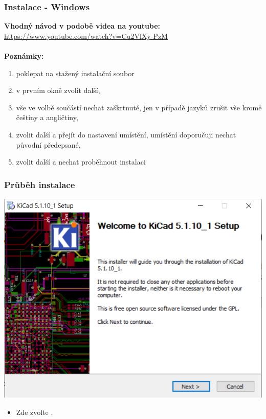 \documentclass{beamer}
\begin{document}
	\begin{frame}
    \frametitle{Instalace - Windows}
    	\textbf{Vhodný návod v podobě videa na youtube:} \url{https://www.youtube.com/watch?v=Cu2VlXy-PzM} \\~\\
    	
    	\textbf{Poznámky:}
		\begin{enumerate}
			\item poklepat na stažený instalační soubor
			\item v prvním okně zvolit další,
			\item vše ve volbě součástí nechat zaškrtnuté, jen v případě jazyků zrušit vše kromě češtiny a angličtiny,
			\item zvolit další a přejít do nastavení umístění, umístění doporučuji nechat původní předepsané,
			\item zvolit další a nechat proběhnout instalaci
		\end{enumerate}
		
	\end{frame}
	\begin{frame}
    \frametitle{Průběh instalace}
		\begin{center}
			\includegraphics[scale=0.5]{obr/kicad_inst1.png}
		\end{center}
		
		\begin{itemize}
			\item Zde zvolte .
		\end{itemize}
	\end{frame}
\end{document}
